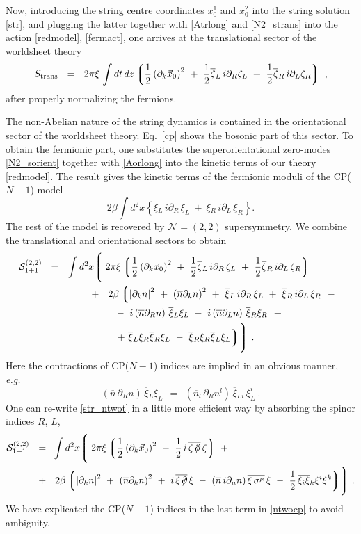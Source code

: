 \documentclass[12pt]{article}
\newcommand{\ntwot}{${\mathcal N}= \left(2,2\right) $ }
\newcommand{\p}{\partial}
\newcommand{\ov}{\overline}
\newcommand{\mc}[1]{\mathcal{#1}}
\newcommand{\lgr}{\left\lgroup}
\newcommand{\rgr}{\right\rgroup}
\def\slashed#1{\setbox0=\hbox{$#1$}             %
   \dimen0=\wd0                                 %
   \setbox1=\hbox{/} \dimen1=\wd1               %
   \ifdim\dimen0>\dimen1                        %
      \rlap{\hbox to \dimen0{\hfil/\hfil}}      %
      #1                                        %
   \else                                        %
      \rlap{\hbox to \dimen1{\hfil$#1$\hfil}}   %
      /                                         %
   \fi}                                        %
\newcommand{\bxir}{\ov{\xi}{}_R}
\newcommand{\bxil}{\ov{\xi}{}_L}
\newcommand{\xir}{\xi_R}
\newcommand{\xil}{\xi_L}
\newcommand{\nbar}{\ov{n}}
\begin{document}
	Now, introducing the string centre coordinates $ x_0^1 $ and $ x_0^2 $ into the string solution \eqref{str}, and 
	plugging the latter together with \eqref{Atrlong} and \eqref{N2_strans} into the action \eqref{redmodel}, \eqref{fermact},
	one arrives at the translational sector of the worldsheet theory
\[
	S_{\rm trans} ~~=~~ 2\pi\xi\, \int dt\,dz 
                                       \lgr
					     \frac{1}{2} \left(\p_k \vec{x}_0 \right)^2
					~+~  \frac{1}{2} \ov{\zeta}{}_L\, i\p_R \zeta_L 
					~+~  \frac{1}{2} \ov{\zeta}{}_R\, i\p_L \zeta_R
				       \rgr~,
\]
	after properly normalizing the fermions.

	The non-Abelian nature of the string dynamics is contained in the orientational sector of the worldsheet theory.
	Eq.~\eqref{cp} shows the bosonic part of this sector. 
	To obtain the fermionic part, one substitutes the superorientational zero-modes \eqref{N2_sorient} together with
	\eqref{Aorlong} into the kinetic terms of our theory \eqref{redmodel}.
	The result gives the kinetic terms of the fermionic moduli of the CP($N-1$) model
\[
	2\beta \int d^2x \left\{ \bxil\, i\p_R\, \xil ~+~ \bxir\, i\p_L\, \xir \right\}.
\]
	The rest of the model is recovered by \ntwot supersymmetry.
	We combine the translational and orientational sectors to obtain
\begin{align}
%
\notag
\mc{S}_{\rm 1+1}^{\rm (2,2)}  ~~=~~ 
	\int  d^2x
	\Biggl\lgroup\; 
	&
		2\pi\xi \lgr   \frac{1}{2} \left(\p_k \vec{x}_0 \right)^2
				~+~  \frac{1}{2} \ov{\zeta}{}_L\, i\p_R\, \zeta_L 
				~+~  \frac{1}{2} \ov{\zeta}{}_R\, i\p_L\, \zeta_R
			\rgr
	\\
%
\notag
	~~+~~  
	&\;
	2\beta \lgr \left|\p_k n \right|^2  ~+~ \left(\ov{n}\p_k n\right)^2  
		~+~ \ov{\xi}{}_L\, i\p_R\, \xi_L  ~+~ \ov{\xi}{}_R\, i\p_L\,  \xi_R 
	~~-~~
		\right . \\
%
\label{str_ntwot}
	&\;
	~~-~
	i \left(\nbar\p_R n\right)\, \bxil\xil ~-~ i \left(\nbar\p_Ln\right) \, \bxir\xir 
	~~+~~
	\\
%
\notag
	&\;
	\left .
		~~+~
		\bxil \xir \bxir \xil ~-~ \bxir \xir \bxil \xil
	 \rgr
	\Biggr\rgroup ~.
\end{align}
	Here the contractions of CP($N-1$) indices are implied in an obvious manner, {\it e.g.}
\[
	(\nbar\, \p_R n)\, \bxil\xil  ~~=~~ (\nbar_l\, \p_R n^l)\, \ov{\xi}{}_{Li}\, \xil^i~.
\]
	One can re-write \eqref{str_ntwot} in a little more efficient way by absorbing the spinor indices $ R $, $ L $,
\begin{align}
%
\label{ntwocp}
\mc{S}_{\rm 1+1}^{\rm (2,2)}  ~~=~~ &
	\int  d^2x
	\Biggl\lgroup\; 
		2\pi\xi \lgr \frac{1}{2} \left(\p_k \vec{x}_0 \right)^2
				~+~ \frac{1}{2} \, i\, \ov{\zeta\,\slashed{\p}} \, \zeta
			\rgr ~+~ \\
%
\notag
	~~+~~  
	&\;
	2\beta \lgr \left|\p_k n \right|^2  ~+~ \left(\ov{n}\p_k n\right)^2  
	~+~ i\,\ov{\xi\,\slashed{\p}}\,\xi ~-~ 
		\left(\ov{n}\,i\p_\mu n\right) \ov{\xi\,\sigma^\mu}\,\xi 
	~-~ \frac{1}{2}\, \ov{\xi_i \xi}{}_k \xi^i \xi^k 
	\rgr
	\Biggr\rgroup~.
\end{align}
	We have explicated the CP($N-1$) indices in the last term in \eqref{ntwocp} to avoid ambiguity.
\end{document}
